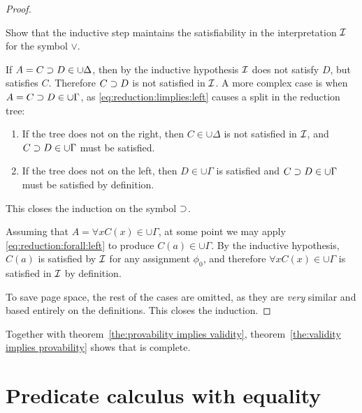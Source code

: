 \documentclass[11pt,a4paper]{article}
\begin{document}
\begin{proof}
    \begin{exercise}[8.3.3]\label{exe:8.3.3}
        Show that the inductive step maintains
        the satisfiability in  the interpretation \(\mathcal{I}\)
        for the symbol \(\lor\).
    \end{exercise}

    If \(A = C\supset D\in\cup\Delta\), then by the inductive hypothesis
    \(\mathcal{I}\) does not satisfy \(D\), but satisfies \(C\).
    Therefore \(C\supset D\) is not satisfied in \(\mathcal{I}\).
    A more complex case is when \(A = C\supset D\in\cup\Gamma\),
    as \eqref{eq:reduction:limplies:left} causes a split in the reduction tree:
    \begin{enumerate}
        \item
            If the tree does not \halt{} on the right,
            then \(C\in\cup\Delta\) is not satisfied in \(\mathcal{I}\),
            and \(C\supset D\in\cup\Gamma\) must be satisfied.
        \item
            If the tree does not \halt{} on the left,
            then \(D\in\cup\Gamma\) is satisfied and \(C\supset D\in\cup\Gamma\)
            must be satisfied by definition.
    \end{enumerate}
    This closes the induction on the symbol \(\supset\).

    Assuming that \(A = \forall xC(x)\in\cup\Gamma\),
    at some point we may apply \eqref{eq:reduction:forall:left}
    to produce \(C(a)\in\cup\Gamma\). By the inductive hypothesis,
    \(C(a)\) is satisfied by \(\mathcal{I}\) for any assignment \(\phi_0\),
    and therefore \(\forall xC(x)\in\cup\Gamma\) is satisfied in
    \(\mathcal{I}\) by definition.

    To save page space, the rest of the cases are omitted,
    as they are \emph{very} similar and based
    entirely on the definitions. This closes the induction.
\end{proof}

Together with theorem~\ref{the:provability implies validity},
theorem~\ref{the:validity implies provability}
shows that \LK{} is complete.

\section{Predicate calculus with equality}
\end{document}
